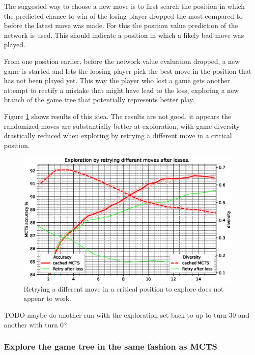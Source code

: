\documentclass[12pt,onecolumn,oneside,titlepage]{article}
\begin{document}
The suggested way to choose a new move is to first search the position in which the predicted chance to win of the losing player dropped the most compared to before the latest move was made. For this the position value prediction of the network is used.
This should indicate a position in which a likely bad move was played.

From one position earlier, before the network value evaluation dropped, a new game is started and lets the loosing player pick the best move in the position that has not been played yet.
This way the player who lost a game gets another attempt to rectify a mistake that might have lead to the loss, exploring a new branch of the game tree that potentially represents better play.

Figure \ref{fig:winp_tree} shows results of this idea. The results are not good, it appears the randomized moves are substantially better at exploration, with game diversity drastically reduced when exploring by retrying a different move in a critical position.


\begin{figure}[H]
\centering
\includegraphics[clip,width=\columnwidth]{winp_tree}
\caption{Retrying a different move  in a critical position to explore does not appear to work.}
\label{fig:winp_tree}
\end{figure}

TODO maybe do another run with the exploration set back to up to turn 30 and another with turn 0?

\subsubsection{Explore the game tree in the same fashion as MCTS}
\end{document}
